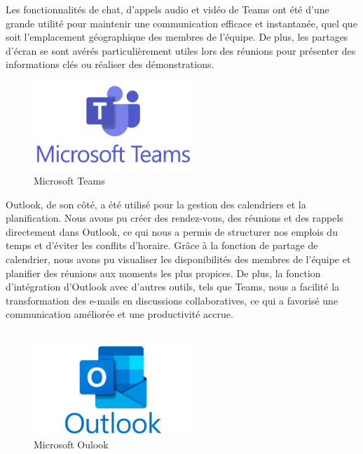 Les fonctionnalités de chat, d'appels audio et vidéo de Teams ont été d'une grande utilité pour maintenir une communication efficace et instantanée, quel que soit l'emplacement géographique des membres de l'équipe. De plus, les partages d'écran se sont avérés particulièrement utiles lors des réunions pour présenter des informations clés ou réaliser des démonstrations.\\

\begin{figure}[H] 
    \centering
    \includegraphics[width=6cm]{Figures/Microsoft_Teams.png}
    \caption{Microsoft Teams}
\end{figure}


Outlook, de son côté, a été utilisé pour la gestion des calendriers et la planification. Nous avons pu créer des rendez-vous, des réunions et des rappels directement dans Outlook, ce qui nous a permis de structurer nos emplois du temps et d'éviter les conflits d'horaire. Grâce à la fonction de partage de calendrier, nous avons pu visualiser les disponibilités des membres de l'équipe et planifier des réunions aux moments les plus propices. De plus, la fonction d'intégration d'Outlook avec d'autres outils, tels que Teams, nous a facilité la transformation des e-mails en discussions collaboratives, ce qui a favorisé une communication améliorée et une productivité accrue.
\\
\\
\begin{figure}[H] 
    \centering
    \includegraphics[width=6cm]{Figures/outlook.png}
    \caption{Microsoft Oulook}
\end{figure}



